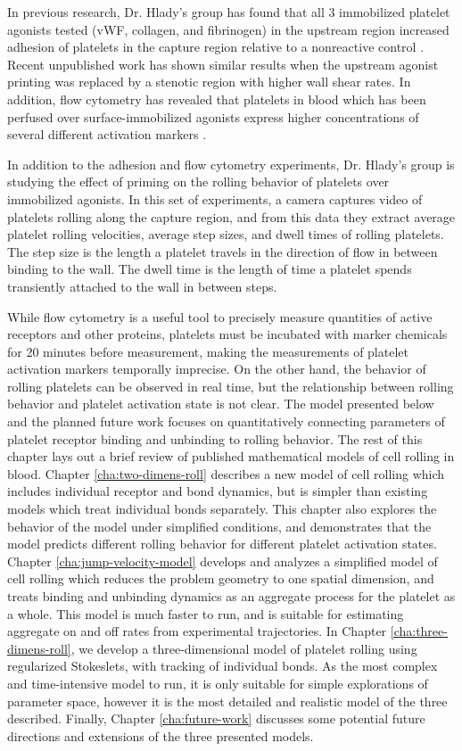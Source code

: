 In previous research, Dr. Hlady's group has found that all 3
immobilized platelet agonists tested (vWF, collagen, and fibrinogen)
in the upstream region increased adhesion of platelets in the capture
region relative to a nonreactive control
\cite{Corum2012,Eichinger2016}. Recent unpublished work has shown
similar results when the upstream agonist printing was replaced by a
stenotic region with higher wall shear rates. In addition, flow
cytometry has revealed that platelets in blood which has been perfused
over surface-immobilized agonists express higher concentrations of
several different activation markers \cite{Corum2012,Eichinger2016}.

In addition to the adhesion and flow cytometry experiments,
Dr. Hlady's group is studying the effect of priming on the
rolling behavior of platelets over immobilized agonists. In this set
of experiments, a camera captures video of platelets rolling along the
capture region, and from this data they extract average platelet
rolling velocities, average step sizes, and dwell times of rolling
platelets. The step size is the length a platelet travels in the
direction of flow in between binding to the wall. The dwell time is
the length of time a platelet spends transiently attached to the wall
in between steps.

While flow cytometry is a useful tool to precisely measure quantities
of active receptors and other proteins, platelets must be incubated
with marker chemicals for 20 minutes before measurement, making the
measurements of platelet activation markers temporally imprecise. On
the other hand, the behavior of rolling platelets can be observed in
real time, but the relationship between rolling behavior and platelet
activation state is not clear. The model presented below and the
planned future work focuses on quantitatively connecting parameters of
platelet receptor binding and unbinding to rolling behavior. The rest
of this chapter lays out a brief review of published mathematical
models of cell rolling in blood. Chapter \ref{cha:two-dimens-roll}
describes a new model of cell rolling which includes individual
receptor and bond dynamics, but is simpler than existing models which
treat individual bonds separately. This chapter also explores the
behavior of the model under simplified conditions, and demonstrates
that the model predicts different rolling behavior for different
platelet activation states. Chapter \ref{cha:jump-velocity-model}
develops and analyzes a simplified model of cell rolling which reduces
the problem geometry to one spatial dimension, and treats binding and
unbinding dynamics as an aggregate process for the platelet as a
whole. This model is much faster to run, and is suitable for
estimating aggregate on and off rates from experimental
trajectories. In Chapter \ref{cha:three-dimens-roll}, we develop a
three-dimensional model of platelet rolling using regularized
Stokeslets, with tracking of individual bonds. As the most complex and
time-intensive model to run, it is only suitable for simple
explorations of parameter space, however it is the most detailed and
realistic model of the three described. Finally, Chapter
\ref{cha:future-work} discusses some potential future directions and
extensions of the three presented models.

